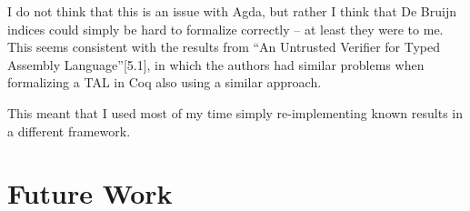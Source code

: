 I do not think that this is an issue with Agda, but rather I think that De
Bruijn indices could simply be hard to formalize correctly -- at least they were
to me. This seems consistent with the results from ``An Untrusted Verifier for
Typed Assembly Language''\cite{untrusted}[5.1], in which the authors had similar
problems when formalizing a TAL in Coq also using a similar approach.

This meant that I used most of my time simply re-implementing known results in a
different framework.

\section{Future Work}
